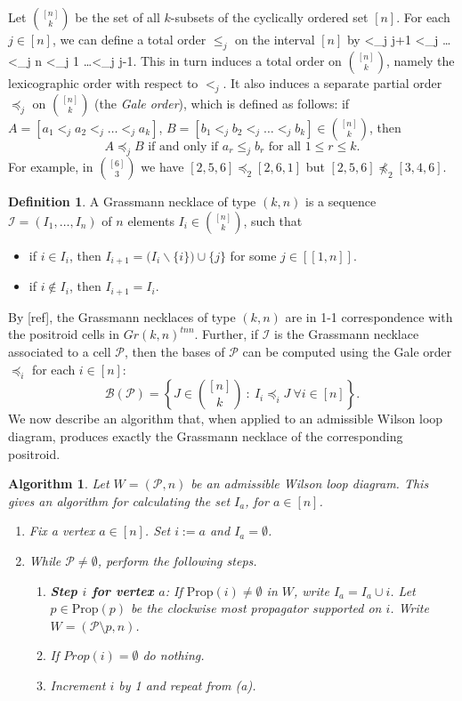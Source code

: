 \documentclass[11pt]{article}
\def\bas #1\eas{\begin{align*} #1 \end{align*}}
\newcommand{\cP}{\mathcal{P}}
\newcommand{\Prop}{\textrm{Prop}}
\newcommand{\II}{\mathcal{I}}
\newcommand{\PP}{\mathcal{P}}
\newcommand{\BB}{\mathcal{B}}
\newcommand{\interval}[2]{[\![#1,#2]\!]}
\newcommand{\gale}[1]{\preccurlyeq_{#1}}
\newtheorem{algorithm}[thm]{Algorithm}
\theoremstyle{remark}
\theoremstyle{definition}
\newtheorem{dfn}[thm]{Definition}
\begin{document}
Let $\binom{[n]}{k}$ be the set of all $k$-subsets of the cyclically ordered set $[n]$.  For each $j \in [n]$, we can define a total order $\leq_j$ on the interval $[n]$ by
\bas j <_j j+1 <_j \dots <_j n <_j 1 \dots <_j j-1\;.\eas
This in turn induces a total order on $\binom{[n]}{k}$, namely the lexicographic order with respect to $<_j$.  It also induces a separate partial order $\gale{j}$ on $\binom{[n]}{k}$ (the \textit{Gale order}), which is defined as follows: if $A = [a_1 <_j a_2 <_j \dots <_j a_k]$,  $B = [b_1 <_j b_2 <_j \dots <_j b_k] \in \binom{[n]}{k}$, then
\[A \gale{j} B \text{ if and only if } a_r \leq_j b_r \text{ for all }1 \leq r \leq k.\]
For example, in $\binom{[6]}{3}$ we have $[2,5,6]\gale{2} [2,6,1]$ but $[2,5,6]\not\gale{2}[3,4,6]$.


\begin{dfn}\label{def:grassmann necklace}
A Grassmann necklace of type $(k,n)$ is a sequence $\II = (I_1, \dots, I_n)$ of $n$ elements $I_i \in \binom{[n]}{k}$, such that
\begin{itemize}
\item if $i \in I_i$, then $I_{i+1} = \big(I_i \backslash \{i\}\big) \cup \{j\}$ for some $j \in \interval{1}{n}$.
\item if $i \not\in I_i$, then $I_{i+1} = I_i$.
\end{itemize}
\end{dfn}

By [ref], the Grassmann necklaces of type $(k,n)$ are in 1-1 correspondence with the positroid cells in $Gr(k,n)^{tnn}$.  Further, if $\II$ is the Grassmann necklace associated to a cell $\PP$, then the bases of $\PP$ can be computed using the Gale order $\gale{i}$ for each $i \in [n]$:
\[\BB(\PP) = \left\{J \in \binom{[n]}{k}\ :\ I_i \gale{i} J \ \forall i \in [n]\right\}.\]
We now describe an algorithm that, when applied to an admissible Wilson loop diagram, produces exactly the Grassmann necklace of the corresponding positroid.

\begin{algorithm}\label{alg:put GN on WLD}
Let $W = (\cP, n)$ be an admissible Wilson loop diagram. This gives an algorithm for calculating the set $I_a$, for $a \in [n]$.

\begin{enumerate}
\item Fix a vertex $a \in [n]$. Set $i:=a$ and $I_a = \emptyset$.
\item While $\cP \neq \emptyset$, perform the following steps.
\begin{enumerate}
\item \textbf{Step $i$ for vertex $a$}: If $\Prop(i) \neq \emptyset$ in $W$, write $I_a = I_a \cup i$. Let $p \in \Prop(p)$ be the clockwise most propagator supported on $i$. Write $W = (\cP \setminus p, n)$.
\item If $Prop(i) = \emptyset$ do nothing.
\item Increment $i$ by 1 and repeat from (a).
\end{enumerate}
\end{enumerate}
\end{algorithm}
\end{document}
